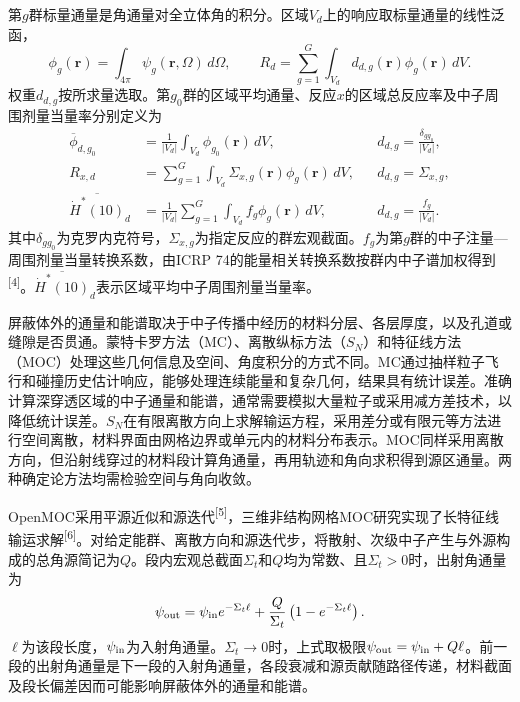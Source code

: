 \documentclass[UTF8, zihao=-4, fontset=none, a4paper]{ctexart}
\newcommand{\upcite}[1]{\textsuperscript{[#1]}}
\begin{document}
第$g$群标量通量是角通量对全立体角的积分。区域$V_d$上的响应取标量通量的线性泛函，
\begin{equation}
\phi_g(\mathbf r)=\int_{4\pi}\psi_g(\mathbf r,\Omega)\,d\Omega,\qquad
R_d=\sum_{g=1}^{G}\int_{V_d}d_{d,g}(\mathbf r)\phi_g(\mathbf r)\,dV.
\label{eq:response}
\end{equation}
权重$d_{d,g}$按所求量选取。第$g_0$群的区域平均通量、反应$x$的区域总反应率及中子周围剂量当量率分别定义为
\begin{equation}
\begin{aligned}
\overline\phi_{d,g_0}&=\frac{1}{|V_d|}\int_{V_d}\phi_{g_0}(\mathbf r)\,dV,
&&d_{d,g}=\frac{\delta_{gg_0}}{|V_d|},\\
R_{x,d}&=\sum_{g=1}^{G}\int_{V_d}\Sigma_{x,g}(\mathbf r)\phi_g(\mathbf r)\,dV,
&&d_{d,g}=\Sigma_{x,g},\\
\overline{\dot H^*(10)}_d&=\frac{1}{|V_d|}\sum_{g=1}^{G}\int_{V_d}f_g\phi_g(\mathbf r)\,dV,
&&d_{d,g}=\frac{f_g}{|V_d|}.
\end{aligned}
\label{eq:response_examples}
\end{equation}
其中$\delta_{gg_0}$为克罗内克符号，$\Sigma_{x,g}$为指定反应的群宏观截面。$f_g$为第$g$群的中子注量—周围剂量当量转换系数，由ICRP 74的能量相关转换系数按群内中子谱加权得到\upcite{4}。$\overline{\dot H^*(10)}_d$表示区域平均中子周围剂量当量率。

屏蔽体外的通量和能谱取决于中子传播中经历的材料分层、各层厚度，以及孔道或缝隙是否贯通。蒙特卡罗方法（MC）、离散纵标方法（$S_N$）和特征线方法（MOC）处理这些几何信息及空间、角度积分的方式不同。MC通过抽样粒子飞行和碰撞历史估计响应，能够处理连续能量和复杂几何，结果具有统计误差。准确计算深穿透区域的中子通量和能谱，通常需要模拟大量粒子或采用减方差技术，以降低统计误差。$S_N$在有限离散方向上求解输运方程，采用差分或有限元等方法进行空间离散，材料界面由网格边界或单元内的材料分布表示。MOC同样采用离散方向，但沿射线穿过的材料段计算角通量，再用轨迹和角向求积得到源区通量。两种确定论方法均需检验空间与角向收敛。

OpenMOC采用平源近似和源迭代\upcite{5}，三维非结构网格MOC研究实现了长特征线输运求解\upcite{6}。对给定能群、离散方向和源迭代步，将散射、次级中子产生与外源构成的总角源简记为$Q$。段内宏观总截面$\Sigma_t$和$Q$均为常数、且$\Sigma_t>0$时，出射角通量为
\begin{equation}
\psi_{\rm out}=\psi_{\rm in}e^{-\Sigma_t\ell}
+\frac{Q}{\Sigma_t}\left(1-e^{-\Sigma_t\ell}\right).
\label{eq:moc_out}
\end{equation}
$\ell$为该段长度，$\psi_{\rm in}$为入射角通量。$\Sigma_t\to0$时，上式取极限$\psi_{\rm out}=\psi_{\rm in}+Q\ell$。前一段的出射角通量是下一段的入射角通量，各段衰减和源贡献随路径传递，材料截面及段长偏差因而可能影响屏蔽体外的通量和能谱。
\end{document}
